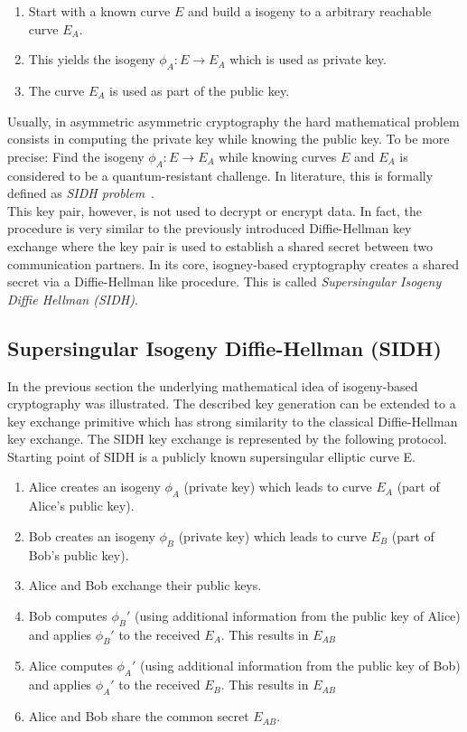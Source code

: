 \begin{enumerate}
\item Start with a known curve $E$ and build a isogeny to a arbitrary reachable curve $E_A$.
\item This yields the isogeny $\phi_A: E \to E_A$ which is used as private key.
\item The curve $E_A$ is used as part of the public key.
\end{enumerate}
Usually, in asymmetric asymmetric cryptography the hard mathematical problem consists in computing the private key while knowing the public key. To be more precise: Find the isogeny $\phi_A: E \to E_A$ while knowing curves $E$ and $E_A$ is considered to be a quantum-resistant challenge. In literature, this is formally defined as \textit{\gls{SIDH} problem}~\parencite{sike2020spec}. 
\\
This key pair, however, is not used to decrypt or encrypt data. In fact, the procedure is very similar to the previously introduced Diffie-Hellman key exchange where the key pair is used to establish a shared secret between two communication partners.
In its core, isogney-based cryptography creates a shared secret via a Diffie-Hellman like procedure. This is called \textit{Supersingular Isogeny Diffie Hellman (\gls{SIDH})}.

\subsection{Supersingular Isogeny Diffie-Hellman (\gls{SIDH})}

In the previous section the underlying mathematical idea of isogeny-based cryptography was illustrated. The described key generation can be extended to a key exchange primitive which has strong similarity to the classical Diffie-Hellman key exchange. The SIDH key exchange is represented by the following protocol.\\
Starting point of \gls{SIDH} is a publicly known supersingular elliptic curve E. 

\begin{enumerate}
\item Alice creates an isogeny $\phi_A$ (private key) which leads to curve $E_A$ (part of Alice's public key).
\item Bob creates an isogeny $\phi_B$ (private key) which leads to curve $E_B$ (part of Bob's public key).
\item Alice and Bob exchange their public keys.
\item Bob computes $\phi_B'$ (using additional information from the public key of Alice) and applies $\phi_B'$ to the received $E_A$. This results in $E_{AB}$
\item Alice computes $\phi_A'$ (using additional information from the public key of Bob) and applies $\phi_A'$ to the received $E_B$. This results in $E_{AB}$
\item Alice and Bob share the  common secret $E_{AB}$.
\end{enumerate}



